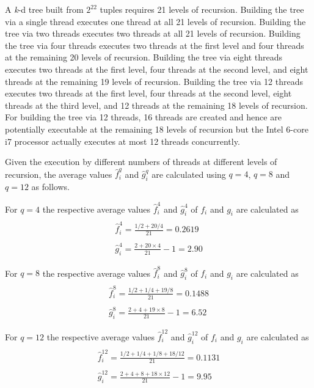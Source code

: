 \documentclass{sig-alternate}
\begin{document}
A \emph{k}-d tree built from $2^{22} $ tuples requires 21 levels of recursion. Building the tree via a single thread executes one thread at all 21 levels of recursion.  Building the tree via two threads executes two threads at all 21 levels of recursion. Building the tree via four threads executes two threads at the first level and four threads at the remaining 20 levels of recursion. Building the tree via eight threads executes two threads at the first level, four threads at the second level, and eight threads at the remaining 19 levels of recursion. Building the tree via 12 threads executes two threads at the first level, four threads at the second level, eight threads at the third level, and 12 threads at the remaining 18 levels of recursion. For building the tree via 12 threads, 16 threads are created and hence are potentially executable at the remaining 18 levels of recursion but the Intel 6-core i7 processor actually executes at most 12 threads concurrently.

Given the execution by different numbers of threads at different levels of recursion, the average values $ \hat{f}_{i}^{q} $ and $ \hat{g}_{i}^{q} $ are calculated using $q=4$, $q=8$ and $q=12$ as follows.

For $q = 4$ the respective average values $ \hat{f}_{i}^{4} $ and $ \hat{g}_{i}^{4}$ of $ f_i $ and $ g_i $ are calculated as
\begin{equation}
\begin{matrix}
\\ \hat{f}_{i}^{4} = \frac{1/2 + 20/4} {21} = 0.2619
\\
\\ \hat{g}_{i}^{4} =  \frac{2 + 20 \times{4}} {21} - 1 = 2.90
\end{matrix}
\label{eq:average4}
\end{equation}

For $q = 8$ the respective average values $ \hat{f}_{i}^{8} $ and $ \hat{g}_{i}^{8}$ of $ f_i $ and $ g_i $ are calculated as
\begin{equation}
\begin{matrix}
\\ \hat{f}_{i}^{8} = \frac{1/2 + 1/4 + 19/8} {21} = 0.1488
\\
\\ \hat{g}_{i}^{8} =  \frac{2 + 4 + 19 \times{8}} {21} - 1 = 6.52
\end{matrix}
\label{eq:average8}
\end{equation}

For $q = 12$ the respective average values $ \hat{f}_{i}^{12} $ and $ \hat{g}_{i}^{12}$ of $ f_i $ and $ g_i $ are calculated as
\begin{equation}
\begin{matrix}
\\ \hat{f}_{i}^{12} = \frac{1/2 + 1/4 + 1/8 + 18/12} {21} = 0.1131
\\
\\ \hat{g}_{i}^{12} =  \frac{2 + 4 + 8 + 18 \times{12}} {21} - 1 = 9.95
\end{matrix}
\label{eq:average8}
\end{equation}
\end{document}
